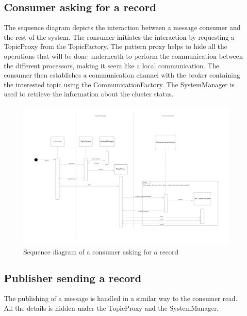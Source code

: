 \subsection{Consumer asking for a record}

The sequence diagram depicts the interaction between a message consumer and
the rest of the system. The consumer initiates the interaction by requesting
a TopicProxy from the TopicFactory.
The pattern proxy helps to hide all the operations that will be done underneath
to perform the communication between the different processors, making it seem
like a local communication.
The consumer then establishes a communication channel with the broker
containing the interested topic using the CommunicationFactory.
The SystemManager is used to retrieve the information about the cluster status.

\begin{figure}[H]
    \centering
    \includegraphics[width=1.0\textwidth]{Figures/sequence_diagram_consumer_poll.png}
    \caption{Sequence diagram of a consumer asking for a record}
\end{figure}

\subsection{Publisher sending a record}

The publishing of a message is handled in a similar way to the consumer read.
All the details is hidden under the TopicProxy and the SystemManager.

